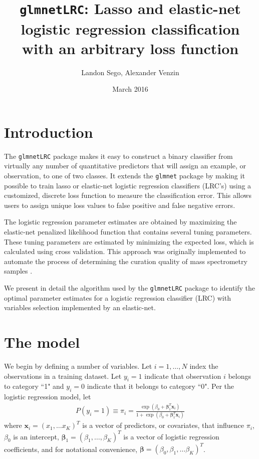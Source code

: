 \documentclass{article}
\begin{document}
 

\title{{\tt glmnetLRC}: Lasso and elastic-net logistic regression classification with an arbitrary loss function\\}
\author{Landon Sego, Alexander Venzin}
\date{March 2016}
\maketitle

\section{Introduction}

The {\tt glmnetLRC} package makes it easy to construct a binary classifier from virtually any number of quantitative predictors 
that will assign an example, or observation, to one of two classes.
It extends the {\tt glmnet} package by making it possible to train lasso or elastic-net logistic 
regression classifiers (LRC's) using a customized, discrete loss function to measure the classification error.  
This allows users to assign unique 
loss values to false positive and false negative errors. 

The logistic regression parameter
estimates are obtained by maximizing the elastic-net penalized likelihood function that contains several tuning parameters. These
tuning parameters are estimated by minimizing the expected loss, which is calculated using cross validation.
This approach was originally implemented to automate the
process of determining the curation quality of mass spectrometry samples \cite{Amidan}. 

We present in detail the algorithm used by the {\tt glmnetLRC} package to identify the optimal parameter estimates
for a logistic regression classifier (LRC) with variables selection implemented by an elastic-net.  

\section{The model}

We begin by defining a
number of variables.  Let $i = 1,\ldots,N$ index the observations in a training dataset. 
Let $y_i = 1$ indicate that observation $i$ belongs to category ``1" and $y_i = 0$ indicate
that it belongs to category ``0".  Per the logistic regression model, let  
\begin{align}
P(y_i = 1) \equiv \pi_i = 
\frac{\exp(\beta_0 + \boldsymbol{\beta}_1^T \mathbf{x}_i)}{1+\exp(\beta_0 + \boldsymbol{\beta}_1^T \mathbf{x}_i)}
\end{align}
\noindent where $\mathbf{x}_i = (x_1, \ldots x_K)^T$ is a vector of predictors, or covariates, that
influence $\pi_i$, $\beta_0$ is an intercept, $\boldsymbol{\beta}_1 = (\beta_1, \ldots, \beta_K)^T$ is a 
vector of logistic regression coefficients, and for notational convenience, 
$\boldsymbol{\beta} = (\beta_0, \beta_1, \ldots \beta_K)^T$. 
\end{document}
